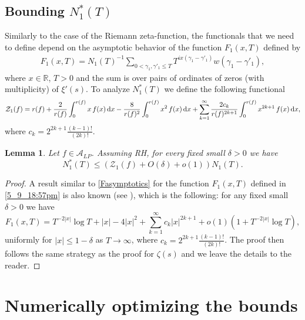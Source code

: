 \documentclass[reqno]{amsart}
\newtheorem{lemma}[theorem]{Lemma}
\newcommand{\A}{\mathcal{A}}
\newcommand{\Z}{\mathcal{Z}}
\renewcommand{\d}{\,\text{\rm d}}
\begin{document}
\subsection{Bounding $N_1^*(T)$}
Similarly to the case of the Riemann zeta-function, the functionals that we need to define depend on the asymptotic behavior of the function $F_1(x,T)$ defined by 
\begin{align} \label{5_9_18:57pm}
F_1(x,T)=N_1(T)^{-1}\displaystyle\sum_{0<\gamma_1, \gamma'_1 \leq T}T^{ix(\gamma_1-\gamma'_1)}w(\gamma_1-\gamma'_1),
\end{align}
where $x\in\mathbb{R}$, $T>0$ and the sum is over pairs of ordinates of zeros (with multiplicity) of $\xi'(s)$. To analyze $N_1^{*}(T)$ we define the following functional
\begin{align*}
\Z_{1}(f) =r(f)+\dfrac{2}{r(f)}\int_{0}^{r(f)}x\, f(x)\d x-\dfrac{8}{r(f)^2}\int_{0}^{r(f)}x^2\, f(x)\d x  +\displaystyle\sum_{k=1}^{\infty}\dfrac{2c_k}{r(f)^{2k+1}}\int_{0}^{r(f)}x^{2k+1}\, f(x)\d x,
\end{align*}
where $c_k=2^{2k+1}\frac{(k-1)!}{(2k)!}$. 

\begin{lemma}\label{thmsimplezerosofxiprime}
Let $f\in \A_{LP}$. Assuming RH, for every fixed small $\delta >0$ we have
\[
N_1^*(T)\leq (\Z_1(f) + O(\delta) + o(1))N_1(T).
\]
\end{lemma}
\begin{proof}
A result similar to \eqref{Fasymptotics} for the function $F_1(x,T)$ defined in \eqref{5_9_18:57pm} is also known (see \cite[Theorem 1.1]{FGL}), which is the following: for any fixed small $\delta>0$ we have
$$
F_1(x,T)=T^{-2|x|}\log T+|x| - 4|x|^2+\displaystyle\sum_{k=1}^{\infty}c_k |x|^{2k+1}+ o(1)(1+T^{-2|x|}\log T),
	$$ 
uniformly for $|x|\leq 1-\delta$ as $T\to\infty$, where $c_k=2^{2k+1}\frac{(k-1)!}{(2k)!}$.  The proof then follows the same strategy as the proof for $\zeta(s)$ and we leave the details to the reader.
\end{proof}
 	
\section{Numerically optimizing the bounds}%
\end{document}
